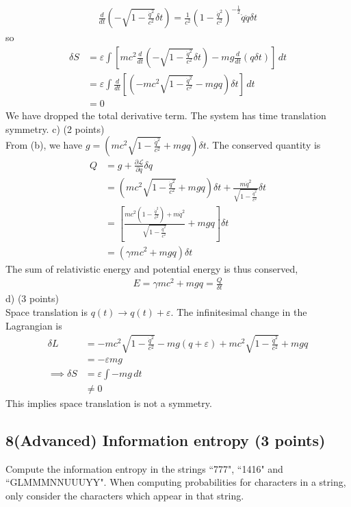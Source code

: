 \documentclass[12pt]{book} %
\numberwithin{equation}{chapter}
\def\c{\gamma}
\def\d{\delta}
\def\e{\varepsilon}
\def\La{\mathcal{L}}
\def\p{\partial}
\def\lq{\hspace{2.5ex}}
\begin{document}
\begin{solbox}
\begin{align*}
\frac{d}{dt}\left(-\sqrt{1-\frac{\dot{q}^{2}}{c^{2}}}\d t\right)=\frac{1}{c^{2}}\left(1-\frac{\dot{q}^{2}}{c^{2}}\right)^{-\frac{1}{2}}\dot{q}\ddot{q}\d t
\end{align*}
so
\begin{align*}
\d S&=\e\int\left[mc^{2}\frac{d}{dt}\left(-\sqrt{1-\frac{\dot{q}^{2}}{c^{2}}}\d t\right)-mg\frac{d}{dt}\left(q\d t\right)\right]\,dt\\
&=\e\int\frac{d}{dt}\left[\left(-mc^{2}\sqrt{1-\frac{\dot{q}^{2}}{c^{2}}}-mgq\right)\d t\right]\,dt\\
&=0
\end{align*}
We have dropped the total derivative term. The system has time translation symmetry.\bigskip\newline
c) (2 points)\\
From (b), we have $g=\left(mc^{2}\sqrt{1-\frac{\dot{q}^{2}}{c^{2}}}+mgq\right)\d t$. The conserved quantity is
\begin{align*}
Q&=g+\frac{\p \La}{\p \dot{q}}\d q\\
&=\left(mc^{2}\sqrt{1-\frac{\dot{q}^{2}}{c^{2}}}+mgq\right)\d t+\frac{m\dot{q}^{2}}{\sqrt{1-\frac{\dot{q}^{2}}{c^{2}}}}\d t\\
&=\left[\frac{mc^{2}\left(1-\frac{\dot{q}^{2}}{c^{2}}\right)+m\dot{q}^{2}}{\sqrt{1-\frac{\dot{q}^{2}}{c^{2}}}}+mgq\right]\d t\\
&=\left(\c mc^{2}+mgq\right)\d t
\end{align*}
The sum of relativistic energy and potential energy is thus conserved,
\begin{align*}
E=\c mc^{2}+mgq=\frac{Q}{\d t}
\end{align*}
d) (3 points)\\
Space translation is $q(t)\to q(t)+\e$. The infinitesimal change in the Lagrangian is
\begin{align*}
\d L&=-mc^{2}\sqrt{1-\frac{\dot{q}^{2}}{c^{2}}}-mg(q+\e)+mc^{2}\sqrt{1-\frac{\dot{q}^{2}}{c^{2}}}+mgq\\
&=-\e mg\\
\implies \d S&=\e\int-mg\,dt\\
&\neq 0
\end{align*}
This implies space translation is not a symmetry.
\end{solbox}

\subsection*{8\lq (Advanced) Information entropy (3 points)}
Compute the information entropy in the strings ``777", ``1416" and ``\textcolor{Lung Mun}{GLMMMNNUUUYY}". When computing probabilities for characters in a string, only consider the characters which appear in that string.
\end{document}
